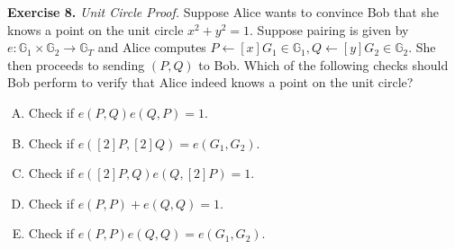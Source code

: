 \documentclass[../lecture-notes.tex]{subfiles}
\begin{document}
\textbf{Exercise 8.} \textit{Unit Circle Proof.} Suppose Alice wants to convince Bob that she knows a point on the unit circle $x^2+y^2=1$. Suppose pairing is given by $e: \mathbb{G}_1 \times \mathbb{G}_2 \to \mathbb{G}_T$ and Alice computes $P \gets [x]G_1 \in \mathbb{G}_1, Q \gets [y]G_2 \in \mathbb{G}_2$. She then proceeds to sending $(P,Q)$ to Bob. Which of the following checks should Bob perform to verify that Alice indeed knows a point on the unit circle?
\begin{enumerate}[(A)]
    \item Check if $e(P,Q)e(Q,P)=1$.
    \item Check if $e([2]P,[2]Q) = e(G_1,G_2)$.
    \item Check if $e([2]P,Q)e(Q,[2]P) = 1$.
    \item Check if $e(P,P)+e(Q,Q) = 1$.
    \item Check if $e(P,P)e(Q,Q)=e(G_1,G_2)$.
\end{enumerate}
\end{document}
